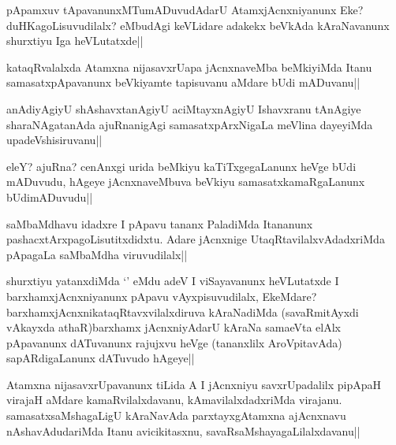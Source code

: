 
\begin{artha}
pApamxuv tApavanunxMTumADuvudAdarU AtamxjAcnxniyanunx Eke? duHKagoLisuvudilalx? eMbudAgi keVLidare adakekx beVkAda kAraNavanunx shurxtiyu Iga heVLutatxde||
\end{artha}

\begin{artha}
kataqRvalalxda Atamxna nijasavxrUapa jAcnxnaveMba beMkiyiMda Itanu samasatxpApavanunx beVkiyamte tapisuvanu aMdare bUdi mADuvanu||
\end{artha}

\begin{artha}
anAdiyAgiyU shAshavxtanAgiyU aciMtayxnAgiyU Ishavxranu tAnAgiye sharaNAgatanAda ajuRnanigAgi samasatxpArxNigaLa meVlina dayeyiMda upadeVshisiruvanu||
\end{artha}


\begin{artha}
eleY? ajuRna? cenAnxgi urida beMkiyu kaTiTxgegaLanunx heVge bUdi mADuvudu, hAgeye jAcnxnaveMbuva beVkiyu samasatxkamaRgaLanunx bUdimADuvudu||
\end{artha}


\begin{artha}
saMbaMdhavu idadxre I pApavu tananx PaladiMda Itananunx pashacxtArxpagoLisutitxdidxtu. Adare jAcnxnige UtaqRtavilalxvAdadxriMda pApagaLa saMbaMdha viruvudilalx||
\end{artha}


\begin{artha}
shurxtiyu yatanxdiMda `\stext' eMdu adeV I viSayavanunx heVLutatxde I barxhamxjAcnxniyanunx pApavu vAyxpisuvudilalx, EkeMdare? barxhamxjAcnxnikataqRtavxvilalxdiruva kAraNadiMda (savaRmitAyxdi vAkayxda athaR)barxhamx jAcnxniyAdarU kAraNa samaeVta elAlx pApavanunx dATuvanunx rajujxvu heVge (tananxlilx AroVpitavAda) sapARdigaLanunx dATuvudo hAgeye||
\end{artha}

\begin{artha}
Atamxna nijasavxrUpavanunx tiLida A I jAcnxniyu savxrUpadalilx pipApaH virajaH aMdare kamaRvilalxdavanu, kAmavilalxdadxriMda virajanu. samasatxsaMshagaLigU kAraNavAda parxtayxgAtamxna ajAcnxnavu nAshavAdudariMda Itanu avicikitasxnu, savaRsaMshayagaLilalxdavanu||
\end{artha}

